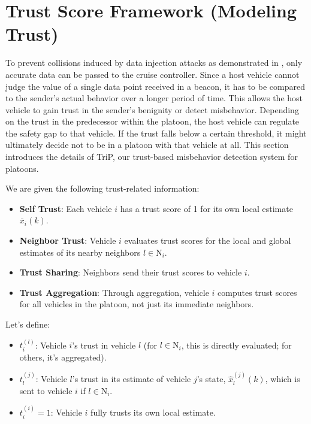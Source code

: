 \documentclass[letterpaper, 10pt, conference]{ieeeconf}  %
\begin{document}

\section{Trust Score Framework (Modeling Trust)}



To prevent collisions induced by data injection attacks as demonstrated in \cite{C_IDM}, only accurate data can be passed to the cruise controller. Since a host vehicle cannot judge the value of a single data point received in a beacon, it has to be compared to the sender's actual behavior over a longer period of time. This allows the host vehicle to gain trust in the sender's benignity or detect misbehavior. Depending on the trust in the predecessor within the platoon, the host vehicle can regulate the safety gap to that vehicle. If the trust falls below a certain threshold, it might ultimately decide not to be in a platoon with that vehicle at all. This section introduces the details of TriP, our trust-based misbehavior detection system for platoons.


We are given the following trust-related information:
\begin{itemize}
    \item \textbf{Self Trust}: Each vehicle \( i \) has a trust score of 1 for its own local estimate \( \bar{x}_i(k) \).
    \item \textbf{Neighbor Trust}: Vehicle \( i \) evaluates trust scores for the local and global estimates of its nearby neighbors \( l \in \mathrm{N}_i \).
    \item \textbf{Trust Sharing}: Neighbors send their trust scores to vehicle \( i \).
    \item \textbf{Trust Aggregation}: Through aggregation, vehicle \( i \) computes trust scores for all vehicles in the platoon, not just its immediate neighbors.
\end{itemize}

Let's define:
\begin{itemize}
    \item \( t_{i}^{(l)} \): Vehicle \( i \)'s trust in vehicle \( l \) (for \( l \in \mathrm{N}_i \), this is directly evaluated; for others, it's aggregated).
    \item \( t_{l}^{(j)} \): Vehicle \( l \)'s trust in its estimate of vehicle \( j \)'s state, \( \hat{x}_l^{(j)}(k) \), which is sent to vehicle \( i \) if \( l \in \mathrm{N}_i \).
    \item \( t_{i}^{(i)} = 1 \): Vehicle \( i \) fully trusts its own local estimate.
\end{itemize}
\end{document}
